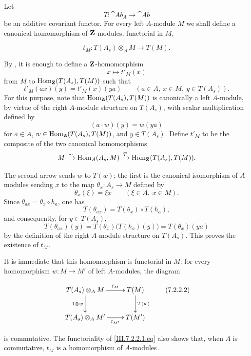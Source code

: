 \begin{env}[7.2.2]
\label{III.7.2.2}
Let
\[
  T:\cat{Ab}_A\longrightarrow\cat{Ab}
\]
be an additive covariant functor.  For every left $A$-module
$M$ we shall define a canonical homomorphism of $\mathbf{Z}$-modules,
functorial in $M$,
\begin{env}[7.2.2.1]
\label{III.7.2.2.1}
\[
  t_M:T(A_s)\otimes_A M\longrightarrow T(M).
  \tag{7.2.2.1}\label{III.7.2.2.1.eq}
\]
\end{env}
By , it is enough to define a
$\mathbf{Z}$-homomorphism
\[
  x\longmapsto t'_M(x)
\]
from $M$ to $\operatorname{Hom}_{\mathbf{Z}}(T(A_s),T(M))$ such that
\[
  t'_M(ax)(y)=t'_M(x)(ya)
  \qquad(a\in A,\ x\in M,\ y\in T(A_s)).
\]
For this purpose, note that
$\operatorname{Hom}_{\mathbf{Z}}(T(A_s),T(M))$ is canonically a left $A$-module,
by virtue of the right $A$-module structure on $T(A_s)$, with
scalar multiplication defined by
\[
  (a\cdot w)(y)=w(ya)
\]
for $a\in A$, $w\in\operatorname{Hom}_{\mathbf{Z}}(T(A_s),T(M))$, and
$y\in T(A_s)$.  Define $t'_M$ to be the composite of the two
canonical homomorphisms
\[
  M
  \xrightarrow{\sim}
  \operatorname{Hom}_A(A_s,M)
  \xrightarrow{T}
  \operatorname{Hom}_{\mathbf{Z}}(T(A_s),T(M)).
\]

The second arrow sends $w$ to $T(w)$; the first is the canonical
isomorphism of $A$-modules sending $x$ to the map
$\theta_x:A_s\to M$ defined by
\[
  \theta_x(\xi)=\xi x
  \qquad(\xi\in A,\ x\in M).
\]
Since $\theta_{ax}=\theta_x\circ h_a$, one has
\[
  T(\theta_{ax})
  =
  T(\theta_x)\circ T(h_a),
\]
and consequently, for $y\in T(A_s)$,
\[
  T(\theta_{ax})(y)
  =
  T(\theta_x)\bigl(T(h_a)(y)\bigr)
  =
  T(\theta_x)(ya)
\]
by the definition of the right $A$-module structure on
$T(A_s)$.  This proves the existence of $t_M$.

It is immediate that this homomorphism is functorial in $M$:
for every homomorphism $w:M\to M'$ of left $A$-modules, the
diagram
\begin{env}[7.2.2.2]
\label{III.7.2.2.2}
\[
\xymatrix{
  T(A_s)\otimes_A M
    \ar[r]^-{t_M}\ar[d]_{1\otimes w}
  & T(M)\ar[d]^{T(w)}
  \\
  T(A_s)\otimes_A M'
    \ar[r]_-{t_{M'}}
  & T(M')
}
\tag{7.2.2.2}\label{III.7.2.2.2.eq}
\]
\end{env}
is commutative.  The functoriality of
\eqref{III.7.2.2.1.eq} also shows that, when $A$ is
commutative, $t_M$ is a homomorphism of $A$-modules
.
\end{env}

